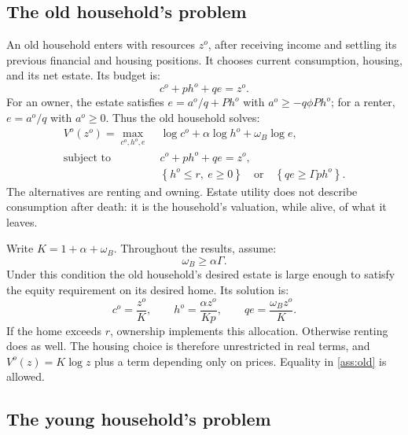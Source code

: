 \documentclass[11pt]{article}
\begin{document}
\subsection{The old household's problem}

An old household enters with resources $z^o$, after receiving income and
settling its previous financial and housing positions. It chooses current
consumption, housing, and its net estate. Its budget is:
\begin{equation}
c^o+ph^o+qe=z^o.
\label{eq:old_budget}
\end{equation}
For an owner, the estate satisfies $e=a^o/q+Ph^o$ with
$a^o\ge-q\phi Ph^o$; for a renter, $e=a^o/q$ with $a^o\ge0$.
Thus the old household solves:
\begin{equation}
\begin{split}
V^o(z^o)=\max_{c^o,h^o,e}\;&\log c^o+\alpha\log h^o+\omega_B\log e,\\
\text{subject to }&c^o+ph^o+qe=z^o,\\
&\left\{h^o\le r,\ e\ge0\right\}
\quad\text{or}\quad\left\{qe\ge\Gamma ph^o\right\}.
\end{split}
\label{eq:new_old_owner}
\end{equation}
The alternatives are renting and owning. Estate utility does not describe
consumption after death: it is the household's valuation, while alive, of
what it leaves.

Write $K=1+\alpha+\omega_B$. Throughout the results, assume:
\begin{equation}
\omega_B\ge\alpha\Gamma.
\tag{A1}\label{ass:old}
\end{equation}
Under this condition the old household's desired estate is large enough to
satisfy the equity requirement on its desired home. Its solution is:
\begin{equation}
c^o=\frac{z^o}{K},\qquad
h^o=\frac{\alpha z^o}{Kp},\qquad
qe=\frac{\omega_B z^o}{K}.
\label{eq:old_solution}
\end{equation}
If the home exceeds $r$, ownership implements this allocation. Otherwise
renting does as well. The housing choice is therefore unrestricted in real
terms, and $V^o(z)=K\log z$ plus a term depending only on prices. Equality
in \eqref{ass:old} is allowed.

\subsection{The young household's problem}
\end{document}

